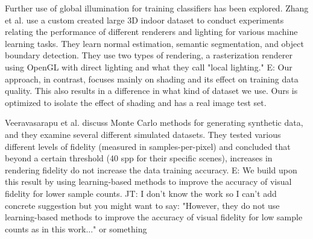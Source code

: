 \documentclass[10pt,twocolumn,letterpaper]{article}
\newcommand{\tompson}[1]{{\color{green} JT: #1}}
\newcommand{\edit}[1]{{\color{red} E: #1}}
\begin{document}
Further use of global illumination for training classifiers has been explored.
Zhang et al. \cite{DBLP:journals/corr/ZhangSYSLJF16} use a custom created large 3D indoor dataset to conduct experiments relating the performance of different renderers and lighting for various machine learning tasks. They learn normal estimation, semantic segmentation, and object boundary detection. They use two types of rendering, a rasterization renderer using OpenGL with direct lighting and what they call "local lighting." \edit{Our approach, in contrast, focuses mainly on shading and its effect on training data quality. This also results in a difference in what kind of dataset we use. Ours is optimized to isolate the effect of shading and has a real image test set.}


Veeravasarapu et al. \cite{DBLP:journals/corr/VeeravasarapuRR16} discuss Monte Carlo methods for generating synthetic data, and they examine several different simulated datasets. They tested various different levels of fidelity (measured in samples-per-pixel) and concluded that beyond a certain threshold (40 spp for their specific scenes), increases in rendering fidelity do not increase the data training accuracy. \edit{We build upon this result by using learning-based methods to improve the accuracy of visual fidelity for lower sample counts. }\tompson{I don't know the work so I can't add concrete suggestion but you might want to say: "However, they do not use learning-based methods to improve the accuracy of visual fidelity for low sample counts as in this work..." or something}
\end{document}
